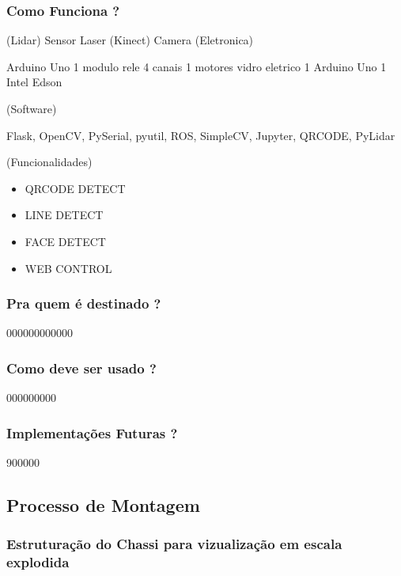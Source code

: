 \documentclass[11pt]{article}
\providecommand{\tightlist}{%
      \setlength{\itemsep}{0pt}\setlength{\parskip}{0pt}}
\begin{document}
\subsubsection{Como Funciona ?}\label{como-funciona}

(Lidar) Sensor Laser (Kinect) Camera (Eletronica)

Arduino Uno 1 modulo rele 4 canais 1 motores vidro eletrico 1 Arduino
Uno 1 Intel Edson

(Software)

Flask, OpenCV, PySerial, pyutil, ROS, SimpleCV, Jupyter, QRCODE, PyLidar

(Funcionalidades)

\begin{itemize}
\tightlist
\item
  QRCODE DETECT
\item
  LINE DETECT
\item
  FACE DETECT
\item
  WEB CONTROL
\end{itemize}

\subsubsection{Pra quem é destinado ?}\label{pra-quem-uxe9-destinado}

000000000000

\subsubsection{Como deve ser usado ?}\label{como-deve-ser-usado}

000000000

\subsubsection{Implementações Futuras
?}\label{implementauxe7uxf5es-futuras}

900000

    \subsection{Processo de Montagem}\label{processo-de-montagem}

\subsubsection{Estruturação do Chassi para vizualização em escala
explodida}\label{estruturauxe7uxe3o-do-chassi-para-vizualizauxe7uxe3o-em-escala-explodida}
\end{document}
